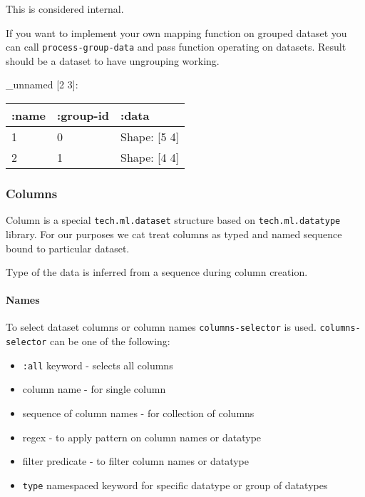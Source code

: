 \documentclass[]{article}
\newenvironment{Shaded}{\begin{snugshade}}{\end{snugshade}}
\newcommand{\AttributeTok}[1]{\textcolor[rgb]{0.77,0.63,0.00}{#1}}
\newcommand{\KeywordTok}[1]{\textcolor[rgb]{0.13,0.29,0.53}{\textbf{#1}}}
\newcommand{\NormalTok}[1]{#1}
\newcommand{\StringTok}[1]{\textcolor[rgb]{0.31,0.60,0.02}{#1}}
\newcommand{\VariableTok}[1]{\textcolor[rgb]{0.00,0.00,0.00}{#1}}
\providecommand{\tightlist}{%
  \setlength{\itemsep}{0pt}\setlength{\parskip}{0pt}}
\let\oldparagraph\paragraph
\renewcommand{\paragraph}[1]{\oldparagraph{#1}\mbox{}}
\begin{document}
This is considered internal.

If you want to implement your own mapping function on grouped dataset
you can call \texttt{process-group-data} and pass function operating on
datasets. Result should be a dataset to have ungrouping working.

\begin{Shaded}
\end{Shaded}

\_unnamed {[}2 3{]}:

\begin{longtable}[]{@{}lll@{}}
\toprule
:name & :group-id & :data\tabularnewline
\midrule
\endhead
1 & 0 & Shape: {[}5 4{]}\tabularnewline
2 & 1 & Shape: {[}4 4{]}\tabularnewline
\bottomrule
\end{longtable}

\hypertarget{columns}{%
\subsubsection{Columns}\label{columns}}

Column is a special \texttt{tech.ml.dataset} structure based on
\texttt{tech.ml.datatype} library. For our purposes we cat treat columns
as typed and named sequence bound to particular dataset.

Type of the data is inferred from a sequence during column creation.

\hypertarget{names}{%
\paragraph{Names}\label{names}}

To select dataset columns or column names \texttt{columns-selector} is
used. \texttt{columns-selector} can be one of the following:

\begin{itemize}
\tightlist
\item
  \texttt{:all} keyword - selects all columns
\item
  column name - for single column
\item
  sequence of column names - for collection of columns
\item
  regex - to apply pattern on column names or datatype
\item
  filter predicate - to filter column names or datatype
\item
  \texttt{type} namespaced keyword for specific datatype or group of
  datatypes
\end{itemize}
\end{document}
